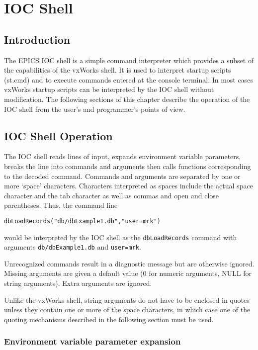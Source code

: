 \chapter{IOC Shell}
\section{Introduction}

The EPICS IOC shell is a simple command interpreter which provides a subset of the capabilities of the vxWorks shell. It 
is used to interpret startup scripts (st.cmd) and to execute commands entered at the console terminal.  In most cases 
vxWorks startup scripts can be interpreted by the IOC shell without modification. The following sections of this chapter 
describe the operation of the IOC shell from the user's and programmer's points of view.

\section{IOC Shell Operation}

The IOC shell reads lines of input, expands environment variable parameters, breaks the line into commands and 
arguments then calls functions corresponding to the decoded command. Commands and arguments are separated by one 
or more `space' characters. Characters interpreted as spaces include the actual space character and the tab character as 
well as commas and open and close parentheses. Thus, the command line

\begin{verbatim}
dbLoadRecords("db/dbExample1.db","user=mrk")
\end{verbatim}

would be interpreted by the IOC shell as the \verb|dbLoadRecords| command with arguments \verb|db/dbExample1.db| and 
\verb|user=mrk|.

Unrecognized commands result in a diagnostic message but are otherwise ignored.  Missing arguments are given a default 
value (0 for numeric arguments, NULL for string arguments).  Extra arguments are ignored.

Unlike the vxWorks shell, string arguments do not have to be enclosed in quotes unless they contain one or more of the 
space characters, in which case one of the quoting mechanisms described in the following section must be used.

\subsection{Environment variable parameter expansion}

